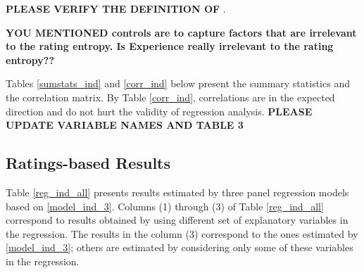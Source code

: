 \documentclass[msom,blindrev]{informs3}
\begin{document}
 \textbf{PLEASE VERIFY THE DEFINITION OF }.


\textbf{YOU MENTIONED controls are to capture factors that are irrelevant to the rating entropy. Is Experience really irrelevant to the rating entropy??}



%

Tables \ref{sumstats_ind} and \ref{corr_ind} below present the summary statistics and the correlation matrix. By Table \ref{corr_ind}, correlations are in the expected direction and do not hurt the validity of regression analysis.
\textbf{PLEASE UPDATE VARIABLE NAMES AND TABLE 3}




\subsection{Ratings-based Results}

Table \ref{reg_ind_all} presents results estimated by three panel regression models based on \eqref{model_ind_3}. Columns (1) through (3) of Table \ref{reg_ind_all} correspond to results obtained by using different set of explanatory variables in the regression. The results in the column (3) correspond to the ones estimated by \eqref{model_ind_3}; others are estimated by considering only some of these variables in the regression.



\end{document}
